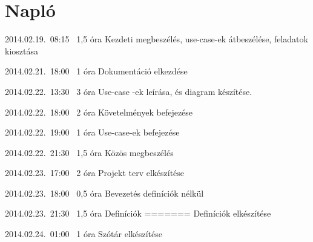 %
\section{Napló}

\begin{naplo}

\bejegyzes
{2014.02.19.~08:15~}
{1,5 óra}
{\vadam\newline
\vantal\newline
\vbator\newline
\vtorok}
{Kezdeti megbeszélés, use-case-ek átbeszélése, feladatok kiosztása}

\bejegyzes
{2014.02.21.~18:00~} %
{1 óra} %
{\vantal} %
{Dokumentáció elkezdése} %

\bejegyzes
{2014.02.22.~13:30~}
{3 óra}
{\vadam}
{Use-case -ek leírása, és diagram készítése.}

\bejegyzes
{2014.02.22.~18:00~}
{2 óra}
{\vbator}
{Követelmények befejezése}

\bejegyzes
{2014.02.22.~19:00~}
{1 óra}
{\vadam}
{Use-case-ek befejezése}

\bejegyzes
{2014.02.22.~21:30~}
{1,5 óra}
{\vadam\newline
\vantal\newline
\vbator\newline
\vtorok}
{Közös megbeszélés}

\bejegyzes
{2014.02.23.~17:00~}
{2 óra}
{\vbator}
{Projekt terv elkészítése}

\bejegyzes
{2014.02.23.~18:00~}
{0,5 óra}
{\vantal}
{Bevezetés definíciók nélkül}

\bejegyzes
{2014.02.23.~21:30~}
{1,5 óra}
{\vantal}
{Definíciók}
=======
{\antal}
{Definíciók elkészítése}

\bejegyzes
{2014.02.24.~01:00~}
{1 óra}
{\vantal}
{Szótár elkészítése}

\end{naplo}
